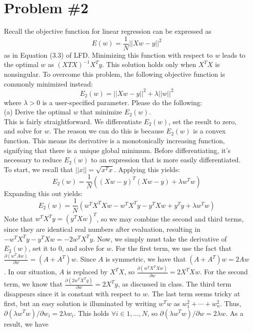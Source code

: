 \documentclass[12pt]{article}
\begin{document}
	\section*{Problem \#2}
	Recall the objective function for linear regression can be expressed as 
	\begin{equation*}
	E(w) = \frac{1}{N} ||Xw-y||^2
	\end{equation*}
	as in Equation (3.3) of LFD. Minimizing this function with respect to $w$ leads to the optimal
	$w$ as $(X T X)^{-1} X^T y$. This solution holds only when $X^TX$ is nonsingular. To overcome this problem, the following objective function is commonly minimized instead:
	\begin{equation*}
	E_2(w) = ||Xw-y||^2 + \lambda ||w||^2
	\end{equation*}
	where $\lambda > 0$ is a user-specified parameter. Please do the following: \\
	(a) Derive the optimal $w$ that minimize $E_2(w)$.\\
	This is fairly straightforward. We differentiate $E_2(w)$, set the result to zero, and solve for $w$. The reason we can do this is because $E_2(w)$ is a convex function. This means its derivative is a monotonically increasing function, signifying that there is a unique global minimum. 
	Before differentiating, it's necessary to reduce $E_2(w)$ to an expression that is more easily differentiated. To start, we recall that $||x||=\sqrt{x^T x}$. Applying this yields:
	\begin{equation*}
	E_2(w) = \frac{1}{N}((Xw-y)^T(Xw-y)+\lambda w^T w)
	\end{equation*}
	Expanding this out yields:
	\begin{equation*}
	E_2(w) = \frac{1}{N} (w^T X^T X w-w^T X^T y-y^T Xw+y^T y + \lambda w^T w)
	\end{equation*}
	Note that $w^T X^T y=(y^T Xw)^T$, so we may combine the second and third terms, since they are identical real numbers after evaluation, resulting in $-w^T X^T y -y^T Xw=-2w^T X^T y$. Now, we simply must take the derivative of $E_2(w)$, set it to $0$, and solve for $w$. For the first term, we use the fact that $\frac{\partial(w^T Aw)}{\partial w} = (A+A^T)w$. Since $A$ is symmetric, we have that $(A+A^T)w=2Aw$. In our situation, $A$ is replaced by $X^T X$, so $\frac{\partial(w^T X^T Xw)}{\partial w} = 2X^T Xw$. For the second term, we know that $\frac{\partial(2w^T X^T y)}{\partial w} = 2X^T y$, as discussed in class. The third term disappears since it is constant with respect to $w$. The last term seems tricky at first, but an easy solution is illuminated by writing $w^T w$ as $w_1^2+\cdots+w_n^2$. Thus, $\partial (\lambda w^T w) / \partial w_i = 2\lambda w_i$. This holds $\forall i \in {1,\dots, N}$, so $\partial (\lambda w^T w) / \partial w = 2\lambda w$. As a result, we have
\end{document}
